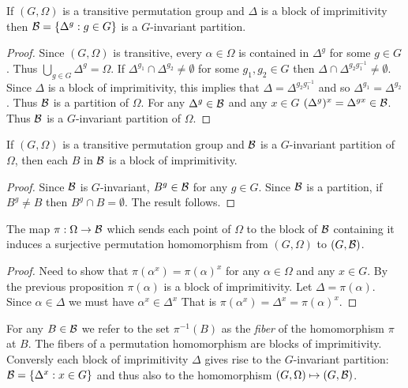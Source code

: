 \begin{proposition}
If $(G,\Omega)$ is a transitive permutation group
and $\Delta$ is a block of imprimitivity
then $\mathcal{B} = \{ \Delta^g : g \in G \}$ is a $G$-invariant
partition.
\begin{proof}
Since $(G,\Omega)$ is transitive,
every $\alpha \in \Omega$ is contained in $\Delta^g$
for some $g \in G$. Thus $\bigcup_{g \in G} \Delta^g = \Omega$.
If $\Delta^{g_1} \cap \Delta^{g_2} \neq \emptyset$
for some $g_1, g_2 \in G$
then $\Delta \cap \Delta^{g_2 g_1^{-1}} \neq \emptyset$.
Since $\Delta$ is a block of imprimitivity,
this implies that $\Delta = \Delta^{g_2 g_1^{-1}}$
and so $\Delta^{g_1} = \Delta^{g_2}$.
Thus $\mathcal{B}$ is a partition of $\Omega$.
For any $\Delta^g \in \mathcal{B}$ and any $x \in G$
$(\Delta^g)^x = \Delta^{gx} \in \mathcal{B}$.
Thus $\mathcal{B}$ is a $G$-invariant partition of $\Omega$.
\end{proof}
\end{proposition}

\begin{proposition}
If $(G,\Omega)$ is a transitive permutation group
and $\mathcal{B}$ is a $G$-invariant partition of $\Omega$,
then each $B$ in $\mathcal{B}$ is a block of imprimitivity.
\begin{proof}
Since $\mathcal{B}$ is $G$-invariant, $B^g \in \mathcal{B}$ for any
$g \in G$. Since $\mathcal{B}$ is a partition, if $B^g \neq B$
then $B^g \cap B = \emptyset$.
The result follows.
\end{proof}
\end{proposition}

\begin{proposition}
The map $\pi : \Omega \to \mathcal{B}$ which sends each point of $\Omega$
to the block of $\mathcal{B}$ containing it
induces a surjective permutation homomorphism from $(G, \Omega)$
to $(G,\mathcal{B})$.
\begin{proof}
Need to show that $\pi(\alpha^x) = \pi(\alpha)^x$
for any $\alpha \in \Omega$ and any $x \in G$.
By the previous proposition $\pi(\alpha)$ is a block of imprimitivity.
Let $\Delta = \pi(\alpha)$. 
Since $\alpha \in \Delta$ we must have $\alpha^x \in \Delta^x$
That is $\pi(\alpha^x) = \Delta^x = \pi(\alpha)^x$.
\end{proof}
\end{proposition}

For any $B \in \mathcal{B}$ we refer to the set $\pi^{-1}(B)$ as the
{\it fiber} of the homomorphism $\pi$ at $B$.
The fibers of a permutation homomorphism are blocks of imprimitivity.
Conversly each block of imprimitivity $\Delta$ 
gives rise to the $G$-invariant partition:
$\mathcal{B} = \{ \Delta^x : x \in G \} $
and thus also to the homomorphism $(G,\Omega) \mapsto (G,\mathcal{B})$.


